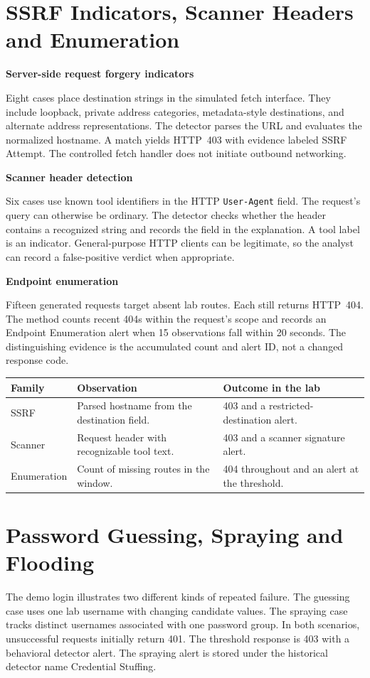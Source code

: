 \documentclass[11pt,letterpaper,oneside]{report}
\newcommand{\topic}[1]{\smallskip\noindent\textbf{#1}\par\nobreak\vspace{-.39em}}
\newcommand{\sheet}[1]{\clearpage\section{#1}}
\newcommand{\tabletitle}[1]{\captionof{table}{#1}\smallskip}
\begin{document}
\sheet{SSRF Indicators, Scanner Headers and Enumeration}
\topic{Server-side request forgery indicators}
Eight cases place destination strings in the simulated fetch interface. They include loopback, private address categories, metadata-style destinations, and alternate address representations. The detector parses the URL and evaluates the normalized hostname. A match yields HTTP~403 with evidence labeled SSRF Attempt. The controlled fetch handler does not initiate outbound networking.

\topic{Scanner header detection}
Six cases use known tool identifiers in the HTTP \texttt{User-Agent} field. The request's query can otherwise be ordinary. The detector checks whether the header contains a recognized string and records the field in the explanation. A tool label is an indicator. General-purpose HTTP clients can be legitimate, so the analyst can record a false-positive verdict when appropriate.

\topic{Endpoint enumeration}
Fifteen generated requests target absent lab routes. Each still returns HTTP~404. The method counts recent 404s within the request's scope and records an Endpoint Enumeration alert when 15 observations fall within 20 seconds. The distinguishing evidence is the accumulated count and alert ID, not a changed response code.

\tabletitle{What each family observes and decides}
\begin{tabularx}{\linewidth}{@{}p{.21\linewidth}YY@{}}\toprule
\textbf{Family} & \textbf{Observation} & \textbf{Outcome in the lab}\\\midrule
SSRF & Parsed hostname from the destination field. & 403 and a restricted-destination alert.\\
Scanner & Request header with recognizable tool text. & 403 and a scanner signature alert.\\
Enumeration & Count of missing routes in the window. & 404 throughout and an alert at the threshold.\\
\bottomrule\end{tabularx}

\sheet{Password Guessing, Spraying and Flooding}
The demo login illustrates two different kinds of repeated failure. The guessing case uses one lab username with changing candidate values. The spraying case tracks distinct usernames associated with one password group. In both scenarios, unsuccessful requests initially return 401. The threshold response is 403 with a behavioral detector alert. The spraying alert is stored under the historical detector name Credential Stuffing.
\end{document}
